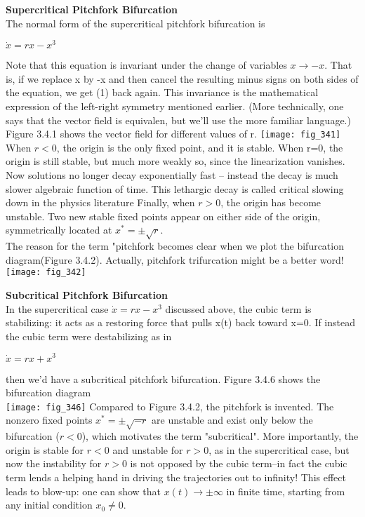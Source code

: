 \documentclass{article}
\newcommand\tab[1][1cm]{\hspace*{#1}}
\begin{document}
\textbf {Supercritical Pitchfork Bifurcation}
\\ \tab The normal form of the supercritical pitchfork bifurcation is 
\begin{center}
$\dot{x}=rx-x^{3}$
\end{center}
Note that this equation is invariant under the change of variables $x \to -x$. That is, if we replace x by -x and then cancel the resulting minus signs on both sides of the equation, we get (1) back again. This invariance is the mathematical expression of the left-right symmetry mentioned earlier. (More technically, one says that the vector field is equivalen, but we'll use the more familiar language.) \\
\tab Figure 3.4.1 shows the vector field for different values of r.
\texttt{[image: fig\_341]}
When $r<0$, the origin is the only fixed point, and it is stable. When r=0, the origin is still stable, but much more weakly so, since the linearization vanishes. Now solutions no longer decay exponentially fast -- instead the decay is much slower algebraic function of time. This lethargic decay is called critical slowing down in the physics literature Finally, when $r >0$, the origin has become unstable. Two new stable fixed points appear on either side of the origin, symmetrically located at $x^{*}=\pm \sqrt{r}$. \\
\tab The reason for the term "pitchfork becomes clear when we plot the bifurcation diagram(Figure 3.4.2). Actually, pitchfork trifurcation might be a better word! \\
\texttt{[image: fig\_342]}

\textbf {Subcritical Pitchfork Bifurcation}
\\ \tab In the supercritical case $\dot{x}=rx-x^{3}$ discussed above, the cubic term is stabilizing: it acts as a restoring force that pulls x(t) back toward x=0. If instead the cubic term were destabilizing as in
\begin{center}
$\dot{x}=rx + x^{3}$
\end{center}
then we'd have a subcritical pitchfork bifurcation. Figure 3.4.6 shows the bifurcation diagram \\
\texttt{[image: fig\_346]}
Compared to Figure 3.4.2, the pitchfork is invented. The nonzero fixed points $x^{*}=\pm \sqrt{-r}$ are unstable and exist only below the bifurcation ($r<0$), which motivates the term "subcritical". More importantly, the origin is stable for $r<0$ and unstable for $r>0$, as in the supercritical case, but now the instability for $r>0$ is not opposed by the cubic term--in fact the cubic term lends a helping hand in driving the trajectories out to infinity! This effect leads to blow-up: one can show that $x(t) \to \pm \infty$ in finite time, starting from any initial condition $x_{0} \neq 0$. \\
\end{document}
